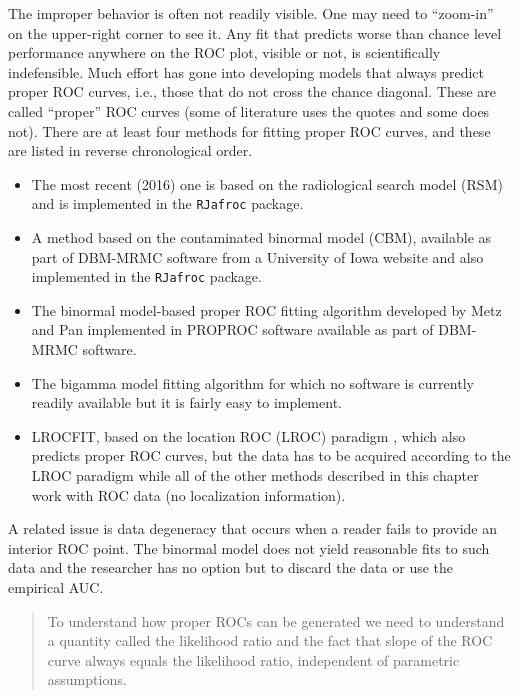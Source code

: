 \documentclass[
]{book}
\begin{document}
The improper behavior is often not readily visible. One may need to ``zoom-in'' on the upper-right corner to see it. Any fit that predicts worse than chance level performance anywhere on the ROC plot, visible or not, is scientifically indefensible. Much effort has gone into developing models that always predict proper ROC curves, i.e., those that do not cross the chance diagonal. These are called ``proper'' ROC curves (some of literature uses the quotes and some does not). There are at least four methods for fitting proper ROC curves, and these are listed in reverse chronological order.

\begin{itemize}
\item
  The most recent (2016) one \citep{chakraborty2011estimating, chakraborty2012inverse} is based on the radiological search model (RSM) and is implemented in the \texttt{RJafroc} package.
\item
  A method \citep{dorfman2000contaminated1, dorfman2000contaminated2, dorfman2000contaminated3} based on the contaminated binormal model (CBM), available as part of DBM-MRMC software from a University of Iowa website and also implemented in the \texttt{RJafroc} package.
\item
  The binormal model-based proper ROC fitting algorithm \citep{metz1999proper, pan1997proper} developed by Metz and Pan implemented in PROPROC software available as part of DBM-MRMC software.
\item
  The bigamma model \citep{dorfman1997proper} fitting algorithm for which no software is currently readily available but it is fairly easy to implement.
\item
  LROCFIT, based on the location ROC (LROC) paradigm \citep{swensson1996unified}, which also predicts proper ROC curves, but the data has to be acquired according to the LROC paradigm while all of the other methods described in this chapter work with ROC data (no localization information).
\end{itemize}

A related issue is data degeneracy that occurs when a reader fails to provide an interior ROC point. The binormal model does not yield reasonable fits to such data and the researcher has no option but to discard the data or use the empirical AUC.

\begin{quote}
To understand how proper ROCs can be generated we need to understand a quantity called the likelihood ratio and the fact that slope of the ROC curve always equals the likelihood ratio, independent of parametric assumptions.
\end{quote}
\end{document}
